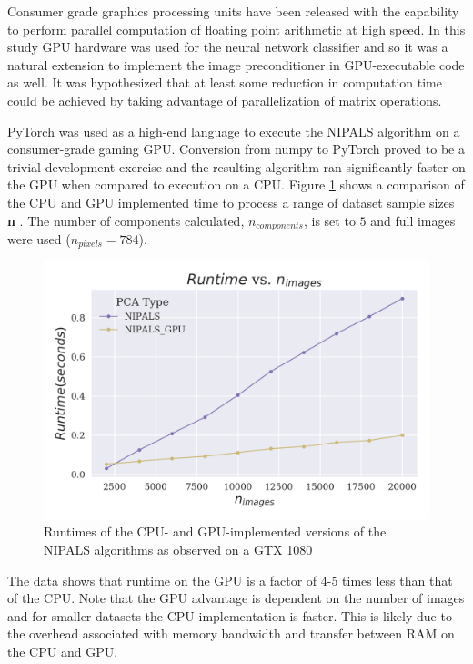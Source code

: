 \documentclass[12pt]{article}
\begin{document}
Consumer grade graphics processing units have been released with the capability to perform parallel computation of floating point arithmetic at high speed. In this study GPU hardware was used for the neural network classifier and so it was a natural extension to implement the image preconditioner in GPU-executable code as well. It was hypothesized that at least some reduction in computation time could be achieved by taking advantage of parallelization of matrix operations. 

PyTorch was used as a high-end language to execute the NIPALS algorithm on a consumer-grade gaming GPU. Conversion from numpy to PyTorch proved to be a trivial development exercise and the resulting algorithm ran significantly faster on the GPU when compared to execution on a CPU. Figure \ref{parallelization} shows a comparison of the CPU and GPU implemented time to process a range of dataset sample sizes \textbf{n} . The number of components calculated, $n_{components}$, is set to $5$ and full images were used ($n_{pixels}=784$). 

\begin{figure}[H]
\begin{center}
\includegraphics[width=\textwidth]{U_GPU.png}
\caption{Runtimes of the CPU- and GPU-implemented versions of the NIPALS algorithms as observed on a GTX 1080}
\label{parallelization}
\end{center}
\end{figure}

The data shows that runtime on the GPU is a factor of 4-5 times less than that of the CPU. Note that the GPU advantage is dependent on the number of images and for smaller datasets the CPU implementation is faster. This is likely due to the overhead associated with memory bandwidth and transfer between RAM on the CPU and GPU.
\end{document}
